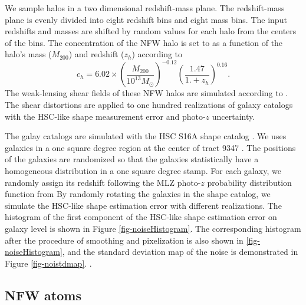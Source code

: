 \documentclass[twocolumn]{aastex62}
\begin{document}
We sample halos in a two dimensional redshift-mass plane. The redshift-mass plane is evenly divided into eight redshift bins
and eight mass bins. The input redshifts and masses are shifted by random values for each halo from the centers of the bins.
The concentration of the NFW halo is set to as a function of the halo's mass ($M_{200}$) and redshift ($z_{h}$) according to
\citet{c-M_Magneticum-Ragagnin2019}
\begin{equation}
c_{h}=6.02\times(\frac{M_{200}}{10^{13} M_{\odot}})^{-0.12}(\frac{1.47}{1.+z_h})^{0.16}.
\end{equation}
The weak-lensing shear fields of these NFW halos are simulated according to \citet{haloModel-TJ2003-3pt}. The shear
distortions are applied to one hundred realizations of galaxy catalogs with the HSC-like shape measurement error and photo-$z$ 
uncertainty.

The galay catalogs are simulated with the HSC S16A shape catalog \citep{HSC1-catalog}.
We uses galaxies in a one square degree region at the center of tract 9347 \citep{HSC1-data}.
The positions of the galaxies are randomized so that the galaxies statistically have a homogeneous distribution in a one square 
degree stamp.
For each galaxy, we randomly assign its redshift following the MLZ photo-$z$ probability distribution function from
By randomly rotating the galaxies in the shape catalog, we simulate the HSC-like shape estimation error with different realizations.
The histogram of the first component of the HSC-like shape estimation error on galaxy
level is shown in Figure \ref{fig-noiseHistogram}. 
The corresponding histogram after the procedure of smoothing and pixelization is also shown in \ref{fig-noiseHistogram}, 
and the standard deviation map of the noise is demonstrated in Figure \ref{fig-noistdmap}.
\citep{HSC1-photoz}.

\subsection{NFW atoms}
\label{subsec:test-nfw}
\end{document}
